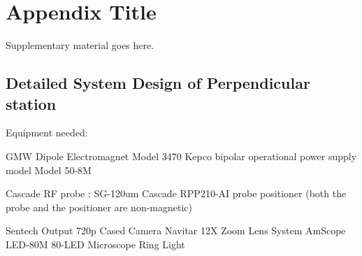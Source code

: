
\appendix
\chapter{Appendix Title}

Supplementary material goes here.

\section{Detailed System Design of Perpendicular station}



Equipment needed:

GMW Dipole Electromagnet Model 3470
Kepco bipolar operational power supply model Model 50-8M 

Cascade RF probe : SG-120um
Cascade RPP210-AI probe positioner
(both the probe and the positioner are non-magnetic)

Sentech Output 720p Cased Camera
Navitar 12X Zoom Lens System
AmScope LED-80M 80-LED Microscope Ring Light


